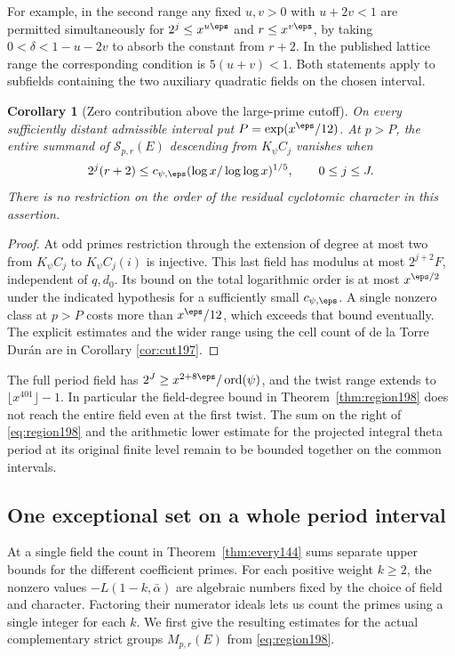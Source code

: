 \documentclass[a4paper,11pt]{article}
\newtheorem{corollary}[proposition]{Corollary}
\theoremstyle{definition}
\theoremstyle{remark}
\numberwithin{equation}{section}
\begin{document}
For example, in the second range any fixed \(u,v>0\) with
\(u+2v<1\) are permitted simultaneously for
\(2^j\le x^{u\eps}\) and \(r\le x^{v\eps}\), by taking
\(0<\delta<1-u-2v\) to absorb the constant from \(r+2\).
In the published lattice range the corresponding condition is
\(5(u+v)<1\). Both statements apply to subfields containing
the two auxiliary quadratic fields on the chosen interval.

\begin{corollary}[Zero contribution above the large-prime cutoff]
\label{cor:cut198}
On every sufficiently distant admissible interval put
\(P=\exp(x^\eps/12)\). At \(p>P\), the entire summand of
\(\mathcal S_{p,r}(E)\) descending from \(K_\psi C_j\) vanishes
when
\[
        2^j(r+2)\le c_{\psi,\eps}
            (\log x/\log\log x)^{1/5},\qquad 0\le j\le J .
\]
There is no restriction on the order of the residual cyclotomic
character in this assertion.
\end{corollary}
\begin{proof}
At odd primes restriction through the extension of degree
at most two from \(K_\psi C_j\) to \(K_\psi C_j(i)\) is injective.
This last field has modulus at most \(2^{j+2}F\), independent
of \(q,d_0\). Its bound on the total logarithmic order is
at most \(x^{\eps/2}\) under the indicated hypothesis for a
sufficiently small \(c_{\psi,\eps}\). A single nonzero class at
\(p>P\) costs more than \(x^\eps/12\), which exceeds that bound
eventually. The explicit estimates and the wider range using the
cell count of de la Torre Dur\'an are in
Corollary \ref{cor:cut197}.
\end{proof}

The full period field has \(2^J\ge
x^{2+8\eps}/\operatorname{ord}(\psi)\), and the twist range extends
to \(\lfloor x^{401}\rfloor-1\). In particular the field-degree
bound in Theorem~\ref{thm:region198} does not reach the entire
field even at the first twist. The sum on the right of
\eqref{eq:region198} and the arithmetic lower estimate for the
projected integral theta period at its original finite level
remain to be bounded together on the common intervals.

\subsection{One exceptional set on a whole period interval}\label{nav:II-37}
At a single field the count in Theorem~\ref{thm:every144} sums
separate upper bounds for the different coefficient primes.
For each positive weight \(k\ge2\), the nonzero values
\(-L(1-k,\bar\alpha)\) are algebraic numbers fixed by the
choice of field and character. Factoring their numerator ideals
lets us count the primes using a single integer for each \(k\).
We first give the resulting estimates for the actual complementary
strict groups \(M_{p,r}(E)\) from \eqref{eq:region198}.
\end{document}
